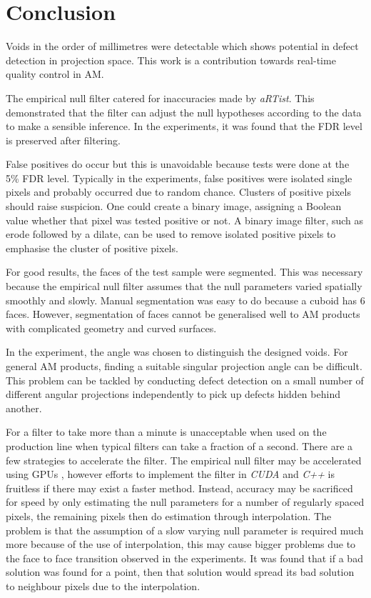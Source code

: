 \documentclass{article}
\begin{document}
\section{Conclusion}

Voids in the order of millimetres were detectable which shows potential in defect detection in projection space. This work is a contribution towards real-time quality control in AM.

The empirical null filter catered for inaccuracies made by \emph{aRTist}. This demonstrated that the filter can adjust the null hypotheses according to the data to make a sensible inference. In the experiments, it was found that the FDR level is preserved after filtering.

False positives do occur but this is unavoidable because tests were done at the 5\% FDR level. Typically in the experiments, false positives were isolated single pixels and probably occurred due to random chance. Clusters of positive pixels should raise suspicion. One could create a binary image, assigning a Boolean value whether that pixel was tested positive or not. A binary image filter, such as erode followed by a dilate, can be used to remove isolated positive pixels to emphasise the cluster of positive pixels.

For good results, the faces of the test sample were segmented. This was necessary because the empirical null filter assumes that the null parameters varied spatially smoothly and slowly. Manual segmentation was easy to do because a cuboid has 6 faces. However, segmentation of faces cannot be generalised well to AM products with complicated geometry and curved surfaces.

In the experiment, the angle was chosen to distinguish the designed voids. For general AM products, finding a suitable singular projection angle can be difficult. This problem can be tackled by conducting defect detection on a small number of different angular projections independently to pick up defects hidden behind another.

For a filter to take more than a minute is unacceptable when used on the production line when typical filters can take a fraction of a second. There are a few strategies to accelerate the filter. The empirical null filter may be accelerated using GPUs \citep{eklund2013medical, hwu2011gpu, yang2008parallel}, however efforts to implement the filter in \emph{CUDA} and \emph{C++} is fruitless if there may exist a faster method. Instead, accuracy may be sacrificed for speed by only estimating the null parameters for a number of regularly spaced pixels, the remaining pixels then do estimation through interpolation. The problem is that the assumption of a slow varying null parameter is required much more because of the use of interpolation, this may cause bigger problems due to the face to face transition observed in the experiments. It was found that if a bad solution was found for a point, then that solution would spread its bad solution to neighbour pixels due to the interpolation.
\end{document}
